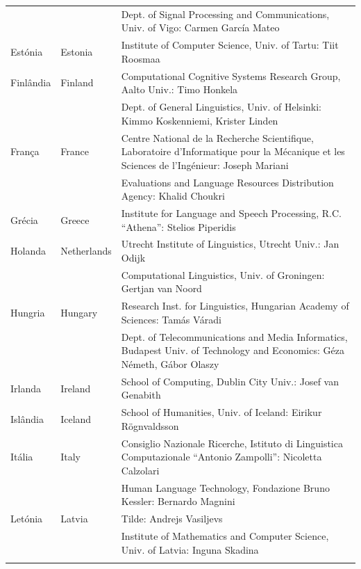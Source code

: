 \begin{longtable}{llp{105mm}}
  & & Dept. of Signal Processing and Communications, Univ. of Vigo: Carmen García Mateo \\ \addlinespace 
  Estónia & \textcolor{grey1}{Estonia} & Institute of Computer Science, Univ. of Tartu: Tiit Roosmaa \\ \addlinespace
  Finlândia & \textcolor{grey1}{Finland} & Computational Cognitive Systems Research Group, Aalto Univ.: Timo Honkela \\ \addlinespace
  & & Dept. of General Linguistics, Univ. of Helsinki: Kimmo Koskenniemi, Krister Linden \\ \addlinespace
  França & \textcolor{grey1}{France} & Centre National de la Recherche Scientifique, Laboratoire d'Informatique pour la Mécanique et les Sciences de l'Ingénieur: Joseph Mariani \\ \addlinespace
  & & Evaluations and Language Resources Distribution Agency: Khalid Choukri \\ \addlinespace 
  Grécia & \textcolor{grey1}{Greece} & Institute for Language and Speech Processing, R.C. “Athena”: Stelios Piperidis \\ \addlinespace
  Holanda & \textcolor{grey1}{Netherlands} & Utrecht Institute of Linguistics, Utrecht Univ.: Jan Odijk \\ \addlinespace 
  & & Computational Linguistics, Univ. of Groningen: Gertjan van Noord \\ \addlinespace
  Hungria & \textcolor{grey1}{Hungary} & Research Inst. for Linguistics, Hungarian Academy of Sciences: Tamás Váradi \\  \addlinespace
  & & Dept. of Telecommunications and Media Informatics, Budapest Univ. of Technology and Economics: Géza Németh, Gábor Olaszy \\ \addlinespace
  Irlanda & \textcolor{grey1}{Ireland} & School of Computing, Dublin City Univ.: Josef van Genabith \\ \addlinespace
  Islândia & \textcolor{grey1}{Iceland} & School of Humanities, Univ. of Iceland: Eirikur Rögnvaldsson \\ \addlinespace
  Itália & \textcolor{grey1}{Italy} & Consiglio Nazionale Ricerche, Istituto di Linguistica Computazionale “Antonio Zampolli”: Nicoletta Calzolari \\ \addlinespace
  & & Human Language Technology, Fondazione Bruno Kessler: Bernardo Magnini \\ \addlinespace 
  Letónia & \textcolor{grey1}{Latvia} & Tilde: Andrejs Vasiljevs \\ \addlinespace 
  & & Institute of Mathematics and Computer Science, Univ. of Latvia: Inguna Skadina\\ \addlinespace

\end{longtable}
